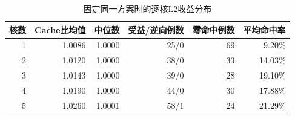 \begin{table}[htbp]\centering
\caption{固定同一方案时的逐核L2收益分布}\label{tab:q3-core-deep}
\small\begin{tabular}{rrrrrr}\toprule
核数 & Cache比均值 & 中位数 & 受益/逆向例数 & 零命中例数 & 平均命中率 \\ \midrule
1 & 1.0086 & 1.0000 & 25/0 & 69 & 9.20\% \\
2 & 1.0120 & 1.0000 & 38/0 & 33 & 14.03\% \\
3 & 1.0143 & 1.0000 & 39/0 & 28 & 19.10\% \\
4 & 1.0190 & 1.0000 & 44/0 & 30 & 17.88\% \\
5 & 1.0260 & 1.0001 & 58/1 & 24 & 21.29\% \\
\bottomrule\end{tabular}\end{table}
